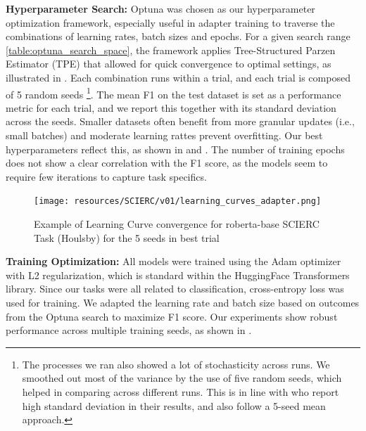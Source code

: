 \documentclass[10pt,twocolumn,letterpaper]{article}
\begin{document}
\textbf{Hyperparameter Search:} Optuna \cite{optuna} was chosen as our hyperparameter optimization framework, especially useful in adapter training to traverse the combinations of learning rates, batch sizes and epochs. For a given search range \ref{table:optuna_search_space}, the framework applies Tree-Structured Parzen Estimator (TPE) that allowed for quick convergence to optimal settings, as illustrated in . Each combination runs within a trial, and each trial is composed of 5 random seeds \footnote{The processes we ran also showed a lot of stochasticity across runs. We smoothed out most of the variance by the use of five random seeds, which helped in comparing across different runs. This is in line with \cite{allenai_dont_stop_pretraining} who report high standard deviation in their results, and also follow a 5-seed mean approach.}. The mean F1 on the test dataset is set as a performance metric for each trial, and we report this together with its standard deviation across the seeds. Smaller datasets often benefit from more granular updates (i.e., small batches) and moderate learning rattes prevent overfitting. Our best hyperparameters reflect this, as shown in  and
. The number of training epochs does not show a clear correlation with the F1 score, as the models seem to require few iterations to capture task specifics.

\begin{figure}[h]
    \centering 
    \texttt{[image: resources/SCIERC/v01/learning\_curves\_adapter.png]}
    \caption{Example of Learning Curve convergence for roberta-base SCIERC Task (Houlsby) for the 5 seeds in best trial}
    \label{fig:learning_curve}
\end{figure}

\textbf{Training Optimization:} All models were trained using the Adam optimizer with L2 regularization, which is standard within the HuggingFace Transformers library. Since our tasks were all related to classification, cross-entropy loss was used for training. We adapted the learning rate and batch size based on outcomes from the Optuna search to maximize F1 score. Our experiments show robust performance across multiple training seeds, as shown in .
\end{document}
